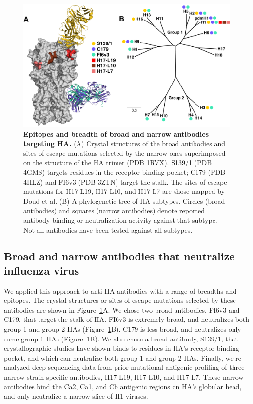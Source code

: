 \documentclass[11pt]{article}
\begin{document}
\begin{figure}
\centerline{\includegraphics[width=\textwidth]{figs/antibody_summary_fig/Ab_summary.pdf}}
\caption{\label{fig:antibody_summary}
{\bf Epitopes and breadth of broad and narrow antibodies targeting HA.}
(A) Crystal structures of the broad antibodies and sites of escape mutations selected by the narrow ones superimposed on the structure of the HA trimer (PDB 1RVX\cite{gamblin2004structure}). 
S139/1 (PDB 4GMS\cite{lee2012heterosubtypic}) targets residues in the receptor-binding pocket; C179 (PDB 4HLZ\cite{dreyfus2013structure}) and FI6v3 (PDB 3ZTN\cite{corti2011neutralizing}) target the stalk. 
The sites of escape mutations for H17-L19, H17-L10, and H17-L7 are those mapped by Doud et al\cite{doud2017complete}. 
(B) A phylogenetic tree of HA subtypes.
Circles (broad antibodies) and squares (narrow antibodies) denote reported antibody binding or neutralization activity against that subtype. 
Not all antibodies have been tested against all subtypes. 
}
\end{figure}

\subsection*{Broad and narrow antibodies that neutralize influenza virus}
We applied this approach to anti-HA antibodies with a range of breadths and epitopes.
The crystal structures or sites of escape mutations selected by these antibodies are shown in Figure~\ref{fig:antibody_summary}A.
We chose two broad antibodies, FI6v3 and C179, that target the stalk of HA\cite{corti2011neutralizing, okuno1993common, dreyfus2013structure}. 
FI6v3 is extremely broad, and neutralizes both group 1 and group 2 HAs (Figure~\ref{fig:antibody_summary}B).
C179 is less broad, and neutralizes only some group 1 HAs (Figure~\ref{fig:antibody_summary}B).
We also chose a broad antibody, S139/1, that crystallographic studies have shown binds to residues in HA's receptor-binding pocket\cite{lee2012heterosubtypic}, and which can neutralize both group 1 and group 2 HAs\cite{yoshida2009cross, lee2012heterosubtypic}.
Finally, we re-analyzed deep sequencing data from prior mutational antigenic profiling of three narrow strain-specific antibodies, H17-L19, H17-L10, and H17-L7\cite{doud2017complete}.
These narrow antibodies bind the Ca2, Ca1, and Cb antigenic regions on HA's globular head\cite{caton1982antigenic}, and only neutralize a narrow slice of H1 viruses.
\end{document}
